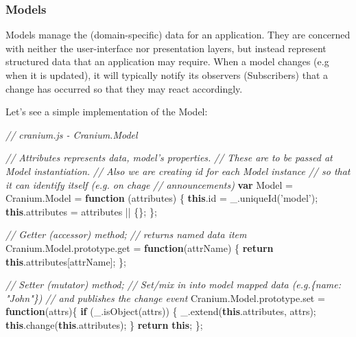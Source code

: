 \documentclass[9pt]{book}
\newenvironment{Shaded}{}{}
\newcommand{\KeywordTok}[1]{\textcolor[rgb]{0.00,0.44,0.13}{\textbf{{#1}}}}
\newcommand{\StringTok}[1]{\textcolor[rgb]{0.25,0.44,0.63}{{#1}}}
\newcommand{\CommentTok}[1]{\textcolor[rgb]{0.38,0.63,0.69}{\textit{{#1}}}}
\newcommand{\OtherTok}[1]{\textcolor[rgb]{0.00,0.44,0.13}{{#1}}}
\newcommand{\FunctionTok}[1]{\textcolor[rgb]{0.02,0.16,0.49}{{#1}}}
\newcommand{\NormalTok}[1]{{#1}}
\begin{document}
\subsubsection{Models}\label{models-4}

Models manage the (domain-specific) data for an application. They are
concerned with neither the user-interface nor presentation layers, but
instead represent structured data that an application may require. When
a model changes (e.g when it is updated), it will typically notify its
observers (Subscribers) that a change has occurred so that they may
react accordingly.

Let's see a simple implementation of the Model:

\begin{Shaded}
\begin{Highlighting}[]
\CommentTok{// cranium.js - Cranium.Model}

\CommentTok{// Attributes represents data, model's properties.}
\CommentTok{// These are to be passed at Model instantiation.}
\CommentTok{// Also we are creating id for each Model instance}
\CommentTok{// so that it can identify itself (e.g. on chage}
\CommentTok{// announcements)}
\KeywordTok{var} \NormalTok{Model = }\OtherTok{Cranium}\NormalTok{.}\FunctionTok{Model} \NormalTok{= }\KeywordTok{function} \NormalTok{(attributes) \{}
    \KeywordTok{this}\NormalTok{.}\FunctionTok{id} \NormalTok{= }\OtherTok{_}\NormalTok{.}\FunctionTok{uniqueId}\NormalTok{(}\StringTok{'model'}\NormalTok{);}
    \KeywordTok{this}\NormalTok{.}\FunctionTok{attributes} \NormalTok{= attributes || \{\};}
\NormalTok{\};}

\CommentTok{// Getter (accessor) method;}
\CommentTok{// returns named data item}
\OtherTok{Cranium}\NormalTok{.}\OtherTok{Model}\NormalTok{.}\OtherTok{prototype}\NormalTok{.}\FunctionTok{get} \NormalTok{= }\KeywordTok{function}\NormalTok{(attrName) \{}
    \KeywordTok{return} \KeywordTok{this}\NormalTok{.}\FunctionTok{attributes}\NormalTok{[attrName];}
\NormalTok{\};}

\CommentTok{// Setter (mutator) method;}
\CommentTok{// Set/mix in into model mapped data (e.g.\{name: "John"\})}
\CommentTok{// and publishes the change event}
\OtherTok{Cranium}\NormalTok{.}\OtherTok{Model}\NormalTok{.}\OtherTok{prototype}\NormalTok{.}\FunctionTok{set} \NormalTok{= }\KeywordTok{function}\NormalTok{(attrs)\{}
    \KeywordTok{if} \NormalTok{(}\OtherTok{_}\NormalTok{.}\FunctionTok{isObject}\NormalTok{(attrs)) \{}
      \OtherTok{_}\NormalTok{.}\FunctionTok{extend}\NormalTok{(}\KeywordTok{this}\NormalTok{.}\FunctionTok{attributes}\NormalTok{, attrs);}
      \KeywordTok{this}\NormalTok{.}\FunctionTok{change}\NormalTok{(}\KeywordTok{this}\NormalTok{.}\FunctionTok{attributes}\NormalTok{);}
    \NormalTok{\}}
    \KeywordTok{return} \KeywordTok{this}\NormalTok{;}
\NormalTok{\};}


\end{Highlighting}
\end{Shaded}
\end{document}
